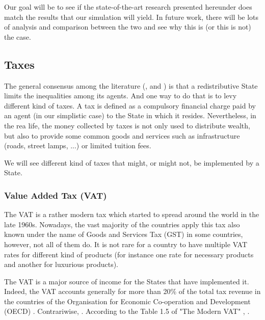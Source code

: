 \documentclass[20pt]{article}
\begin{document}
Our goal will be to see if the state-of-the-art research presented hereunder does match the results that our simulation will yield. In future work, there will be lots of analysis and comparison between the two and see why this is (or this is not) the case.

\subsection{Taxes}

    The general consensus among the literature (\cite{burman2012taxes}, \cite{leigh2008redistributive} and \cite{taxes_inequalities}) is that a redistributive State limits the inequalities among its agents. And one way to do that is to levy different kind of taxes. A tax is defined as a compulsory financial charge paid by an agent (in our simplistic case) to the State in which it resides. 
    Nevertheless, in the rea life, the money collected by taxes is not only used to distribute wealth, but also to provide some common goods and services such as infrastructure (roads, street lamps, ...) or limited tuition fees.
    
    We will see different kind of taxes that might, or might not, be implemented by a State.

    \subsubsection{Value Added Tax (VAT)}
    
    The VAT is a rather modern tax which started to spread around the world in the late 1960s. Nowadays, the vast majority of the countries apply this tax also known under the name of Goods and Services Tax (GST) in some countries, however, not all of them do. It is not rare for a country to have multiple VAT rates for different kind of products (for instance one rate for necessary products and another for luxurious products).
    
    The VAT is a major source of income for the States that have implemented it. Indeed, the VAT accounts generally for more than 20\% of the total tax revenue in the countries of the Organisation for Economic Co-operation and Development (OECD) \cite{TheModernVAT}. Contrariwise,  \cite{OriginOfVAT}. According to the Table 1.5 of "The Modern VAT" \cite{TheModernVAT}, . 
    
\end{document}
